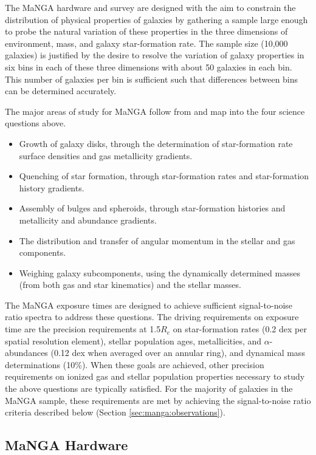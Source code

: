 The MaNGA hardware and survey are designed with the aim to constrain
the distribution of physical properties of galaxies by gathering a
sample large enough to probe the natural variation of these properties
in the three dimensions of environment, mass, and galaxy
star-formation rate. The sample size (10,000 galaxies) is justified by
the desire to resolve the variation of galaxy properties in six bins
in each of these three dimensions with about 50 galaxies in each
bin. This number of galaxies per bin is sufficient such that
differences between bins can be determined accurately.

The major areas of study for MaNGA follow from and map into the four
science questions above.
\begin{itemize}
\item Growth of galaxy disks, through the determination of
  star-formation rate surface densities and gas metallicity gradients.
\item Quenching of star formation, through star-formation rates and
  star-formation history gradients.
\item Assembly of bulges and spheroids, through star-formation
  histories and metallicity and abundance gradients.
\item The distribution and transfer of angular momentum in the stellar
  and gas components.
\item Weighing galaxy subcomponents, using the dynamically determined
  masses (from both gas and star kinematics) and the stellar masses.
\end{itemize}

The MaNGA exposure times are designed to achieve sufficient
signal-to-noise ratio spectra to address these questions.  The driving
requirements on exposure time are the precision requirements at
1.5$R_e$ on star-formation rates (0.2 dex per spatial resolution
element), stellar population ages, metallicities, and
$\alpha$-abundances (0.12 dex when averaged over an annular ring), and
dynamical mass determinations (10\%). When these goals are achieved,
other precision requirements on ionized gas and stellar population
properties necessary to study the above questions are typically
satisfied. For the majority of galaxies in the MaNGA sample, these
requirements are met by achieving the signal-to-noise ratio criteria
described below (Section \ref{sec:manga:observations}).

\subsection{MaNGA Hardware}
\label{sec:manga:hardware}

